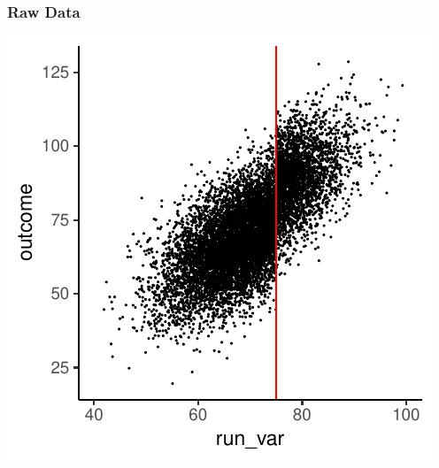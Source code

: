\documentclass[xcolor=x11names,compress]{beamer}\usepackage[]{graphicx}\usepackage[]{color}
\makeatletter
\def\maxwidth{ %
  \ifdim\Gin@nat@width>\linewidth
    \linewidth
  \else
    \Gin@nat@width
  \fi
}
\newenvironment{knitrout}{}{} %
\renewcommand{\(}{\begin{columns}}
\renewcommand{\)}{\end{columns}}
\newcommand{\<}[1]{\begin{column}{#1}}
\renewcommand{\>}{\end{column}}
\makeatother
\begin{document}
\begin{frame}
\frametitle{Raw Data}
\begin{center}
\begin{knitrout}
\color{fgcolor}
\includegraphics[width=\maxwidth]{figure/chart1-1} 

\end{knitrout}
\end{center}
\end{frame}
\end{document}
